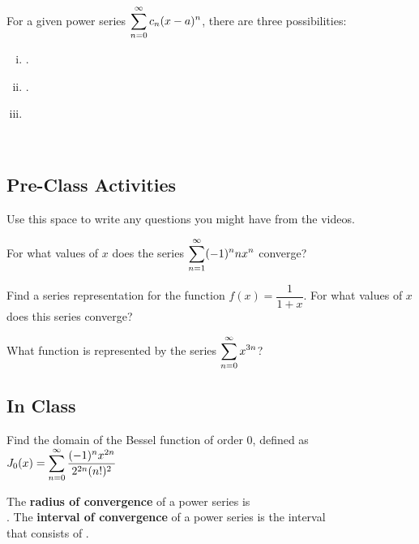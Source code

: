 \documentclass[notes]{subfiles}
\begin{document}
		\begin{thm}
			For a given power series $\displaystyle \sum_{n=0}^\infty c_n(x-a)^n$, there are three possibilities:\\[15pt]
			\begin{enumerate}[(i)]
				\setlength \itemsep{15pt}
				\item {}.
				\item {}.
				\item {}
			\end{enumerate}\\
		\end{thm}
			\newpage
			
	\subsection*{Pre-Class Activities}
		\begin{ex}
			Use this space to write any questions you might have from the videos.
		\end{ex}

		\begin{ex}
			For what values of $x$ does the series $\displaystyle \sum_{n=1}^\infty (-1)^n nx^n$ converge?
		\end{ex}
			
		\begin{ex}
			Find a series representation for the function $f(x) = \dfrac{1}{1 + x}$.  For what values of $x$ does this series converge?
		\end{ex}
			
		\begin{ex}
			What function is represented by the series $\displaystyle \sum_{n=0}^\infty x^{3n}$? 
		\end{ex}
			\newpage
			
	\subsection*{In Class}
		\begin{ex}
			Find the domain of the Bessel function of order 0, defined as $J_0(x) = \displaystyle \sum_{n=0}^\infty \dfrac{(-1)^nx^{2n}}{2^{2n}(n!)^2}$
		\end{ex}
			
		\begin{defn}
			The \textbf{radius of convergence} of a power series is \\[15pt] .  The \textbf{interval of convergence} of a power series is the interval\\[15pt] that consists of .
		\end{defn}
		
\end{document}

